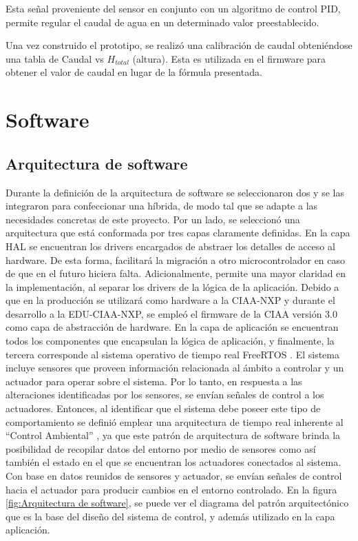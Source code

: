 Esta señal proveniente del sensor en conjunto con un algoritmo de control PID, permite regular el caudal de agua en un determinado valor preestablecido. 

Una vez construido el prototipo, se realizó una calibración de caudal obteniéndose una tabla de Caudal vs $H_{total}$ (altura). Esta es utilizada en el firmware para obtener el valor de caudal en lugar de la fórmula presentada.

\section{Software}
\subsection{Arquitectura de software}
\label{subsec:Arquitectura de software}

Durante la definición de la arquitectura de software se seleccionaron dos  y se las integraron para confeccionar una híbrida, de modo tal que se adapte a las necesidades concretas de este proyecto. Por un lado, se seleccionó una arquitectura que está conformada por tres capas claramente definidas.
En la capa HAL se encuentran los drivers encargados de abstraer los detalles de acceso al hardware. De esta forma, facilitará la migración a otro microcontrolador en caso de que en el futuro hiciera falta. Adicionalmente, permite una mayor claridad en la implementación, al separar los drivers de la lógica de la aplicación.
Debido a que en la producción se utilizará como hardware a la CIAA-NXP y durante el desarrollo a la EDU-CIAA-NXP, se empleó el firmware de la CIAA versión 3.0 como capa de abstracción de hardware. 
En la capa de aplicación se encuentran todos los componentes que encapsulan la lógica de aplicación, y finalmente, la tercera corresponde al sistema operativo de tiempo real FreeRTOS \citep{FREERTOS}.
El sistema incluye sensores que proveen información relacionada al ámbito a controlar y un actuador para operar sobre el sistema. Por lo tanto, en respuesta a las alteraciones identificadas por los sensores, se envían señales de control a los actuadores. Entonces, al identificar que el sistema debe poseer este tipo de comportamiento se definió emplear una arquitectura de tiempo real inherente al “Control Ambiental” \citep{INGSOF} , ya que este patrón de arquitectura de software brinda la posibilidad de recopilar datos del entorno por medio de sensores como así también el estado en el que se encuentran los actuadores conectados al sistema. Con base en datos reunidos de sensores y actuador, se envían señales de control hacia el actuador para producir cambios en el entorno controlado. En la figura \ref{fig:Arquitectura de software}, se puede ver el diagrama del patrón arquitectónico que es la base del diseño del sistema de control, y además utilizado en la capa aplicación. 


